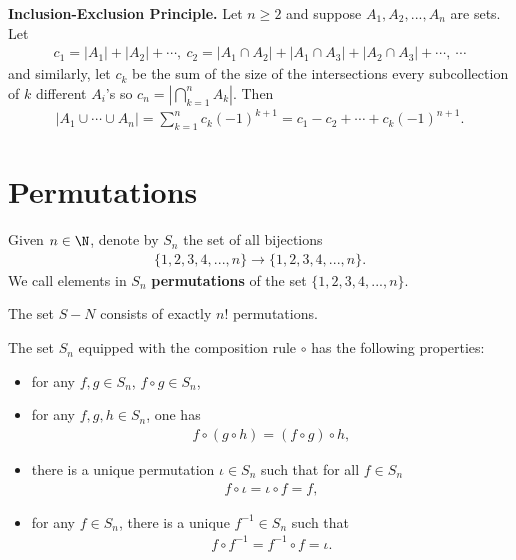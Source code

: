 \documentclass{article}
\begin{document}
\begin{theorem}
    \textbf{Inclusion-Exclusion Principle.} Let $n\geq 2$ and suppose $A_1, A_2, ..., A_n$ are sets. Let
    \begin{align*}
        c_1=|A_1|+|A_2|+\cdots,\:c_2=|A_1\cap A_2|+|A_1\cap A_3|+|A_2\cap A_3|+\cdots,\:\cdots
    \end{align*}
    and similarly, let $c_k$ be the sum of the size of the intersections every subcollection of $k$ different $A_i$'s so $c_n=|\bigcap_{k=1}^n A_k|$. Then
    \begin{align*}
        |A_1\cup \cdots \cup A_n| = \sum_{k=1}^n c_k (-1)^{k+1}=c_1-c_2+\cdots +c_k (-1)^{n+1}.
    \end{align*}
\end{theorem}
\section{Permutations}
\begin{definition}
    Given $n\in\N$, denote by $S_n$ the set of all bijections
    \begin{align*}
        \{1,2,3,4,...,n\}\to\{1,2,3,4,...,n\}.
    \end{align*}
    We call elements in $S_n$ \textbf{permutations} of the set $\{1,2,3,4,...,n\}$.
\end{definition}
\begin{lemma}
    The set $S-N$ consists of exactly $n!$ permutations.
\end{lemma}
\begin{lemma}
    The set $S_n$ equipped with the composition rule $\circ$ has the following properties:
    \begin{itemize}
        \item for any $f,g\in S_n$, $f\circ g\in S_n$,
        \item for any $f,g,h\in S_n$, one has
              \begin{align*}
                  f\circ \left(g\circ h\right)=\left(f\circ g\right)\circ h,
              \end{align*}
        \item there is a unique permutation $\iota \in S_n$ such that for all $f\in S_n$
              \begin{align*}
                  f\circ \iota = \iota \circ f = f,
              \end{align*}
        \item for any $f\in S_n$, there is a unique $f^{-1}\in S_n$ such that
              \begin{align*}
                  f\circ f^{-1}=f^{-1}\circ f = \iota.
              \end{align*}
    \end{itemize}
\end{lemma}
\end{document}
